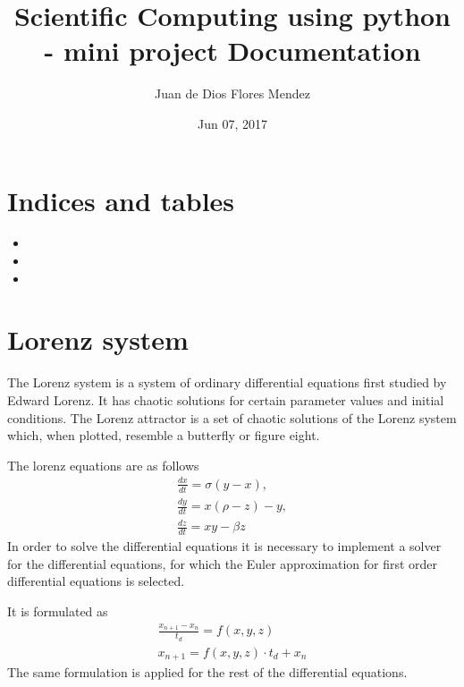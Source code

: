 \documentclass[letterpaper,10pt,english]{sphinxmanual}
\title{Scientific Computing using python - mini project Documentation}
\date{Jun 07, 2017}
\author{Juan de Dios Flores Mendez}
\begin{document}
\maketitle
\sphinxtableofcontents
{}\label{\detokenize{index::doc}}



\chapter{Indices and tables}
\label{\detokenize{index:welcome-to-scientific-computing-using-python-mini-project-s-documentation}}\label{\detokenize{index:indices-and-tables}}\begin{itemize}
\item {} 

\item {} 

\item {} 

\end{itemize}


\chapter{Lorenz system}
\label{\detokenize{index:lorenz-system}}
The Lorenz system is a system of ordinary differential equations first studied by Edward Lorenz. It has chaotic solutions for certain parameter values and initial conditions. The Lorenz attractor is a set of chaotic solutions of the Lorenz system which, when plotted, resemble a butterfly or figure eight.

The lorenz equations are as follows
\begin{equation*}
\begin{split}\frac{dx}{dt} = \sigma (y-x), \\
\frac{dy}{dt} = x(\rho - z) - y, \\
\frac{dz}{dt} = xy - \beta z\end{split}
\end{equation*}
In order to solve the differential equations it is necessary to implement a solver for the differential equations, for which the Euler approximation for first order differential equations is selected.

It is formulated as
\begin{equation*}
\begin{split}\frac{x_{n+1} - x_n}{t_d} = f(x,y,z) \\
x_{n+1} = f(x,y,z) \cdot t_d + x_n\end{split}
\end{equation*}
The same formulation is applied for the rest of the differential equations.
\end{document}
